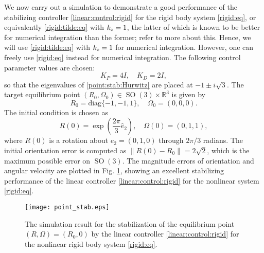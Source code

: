 \documentclass[letterpaper, 10 pt, conference]{ieeeconf}  %
\newcommand{\SO}{\operatorname{SO}(3)}
\newcommand{\coV}{{k_{\rm e}}}
\begin{document}
We now carry out a simulation to demonstrate a good performance of the stabilizing controller \eqref{linear:control:rigid} for the rigid body system \eqref{rigid:eq}, or equivalently \eqref{rigid:tilde:eq} with $\coV=1$, the latter of which is known to be better for numerical integration than the former; refer to  \cite{ChJiPe16} more about this.  Hence, we will use \eqref{rigid:tilde:eq} with $\coV=1$ for numerical integration. However, one can freely use \eqref{rigid:eq} instead for numerical integration.
The following control parameter values are chosen: %
\[
K_P = 4I, \quad K_D = 2I,
\]
 so that  the eigenvalues of \eqref{point:stab:Hurwitz} are placed at $-1\pm i \sqrt 3$.
The target equilibrium point $(R_0,\Omega_0) \in \SO \times \mathbb R^3$ is given by
\[
R_0 = \textrm{diag} \{-1,-1,1\}, \quad \Omega_0 = (0,0,0).
\]
The initial condition is chosen as 
\[
R(0) = \exp \left (\frac{2\pi}{3}\hat e_2 \right ), \quad \Omega(0) = (0,1,1),
\]
where $R(0)$ is a rotation about  $e_2=(0,1,0)$ through $2\pi/3$ radians.  The initial orientation error is computed as $\|R(0) - R_0\| = 2\sqrt 2$, which is the maximum possible error on $\SO$.  The magnitude errors of orientation and angular velocity  are plotted in Fig. \ref{figure.point.stab}, showing an excellent stabilizing performance of  the linear controller \eqref{linear:control:rigid} for the nonlinear system \eqref{rigid:eq}. 
\begin{figure}[bt]
\begin{center}
\texttt{[image: point\_stab.eps]}
\end{center}
\caption{\label{figure.point.stab}  The simulation result for  the stabilization of the equilibrium point $(R, \Omega ) = (R_0, 0)$ by the linear controller \eqref{linear:control:rigid} for the nonlinear rigid body system  \eqref{rigid:eq}.}
\end{figure}
\end{document}

